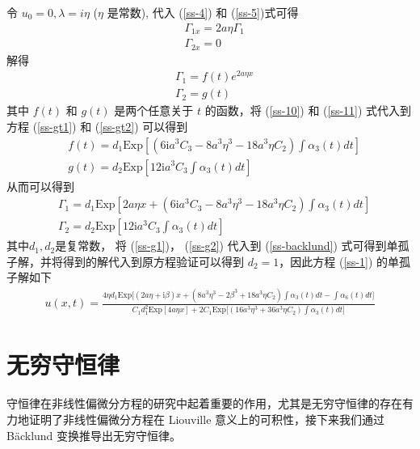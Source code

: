 令 $u_{0} = 0, \lambda = i\eta$ ($\eta$ 是常数), 代入 (\ref{ss-4}) 和  (\ref{ss-5})式可得
\begin{align}
  & \Gamma_{1x} = 2a\eta\Gamma_{1} \\
  & \Gamma_{2x} = 0
\end{align}
解得
\begin{align}
  & \Gamma_{1} = f(t)e^{2a\eta x}  \label{ss-10}\\
  & \Gamma_{2} = g(t) \label{ss-11}
\end{align}
其中 $f(t)$ 和 $g(t)$ 是两个任意关于  $t$ 的函数，将 (\ref{ss-10}) 和 (\ref{ss-11}) 式代入到方程 (\ref{ss-gt1}) 和 (\ref{ss-gt2}) 可以得到
\begin{align}
  & f(t) = d_{1}\mathrm{Exp}\left[(6\mathrm{i}a^{3}C_{3} - 8a^{3}\eta^{3} - 18a^{3}\eta C_{2})\int \alpha_{3}(t)dt\right] \\
  & g(t) = d_{2}\mathrm{Exp}\left[12\mathrm{i}a^{3}C_{3}\int \alpha_{3}(t)dt\right]
\end{align}
从而可以得到
\begin{align}
  & \Gamma_{1} = d_{1}\mathrm{Exp}\left[2a\eta x + (6\mathrm{i}a^{3}C_{3} - 8a^{3}\eta^{3} - 18a^{3}\eta C_{2})\int \alpha_{3}(t)dt\right] \label{ss-g1} \\
  & \Gamma_{2} = d_{2}\mathrm{Exp}\left[12\mathrm{i}a^{3}C_{3}\int \alpha_{3}(t)dt\right] \label{ss-g2}
\end{align}
其中$d_{1}, d_{2}$是复常数， 将  (\ref{ss-g1})， (\ref{ss-g2}) 代入到  (\ref{ss-backlund}) 式可得到单孤子解，并将得到的解代入到原方程验证可以得到 $d_{2} = 1$，因此方程 (\ref{ss-1}) 的单孤子解如下
\begin{align}
  u(x,t) = \frac{4\eta d_{1}\mathrm{Exp}\Big[(2a\eta+\mathrm{i}\beta)x + (8a^{3}\eta^{3} - 2\beta^{3} + 18a^{3}\eta C_{2})\int \alpha_{3}(t)dt - \int \alpha_{6}(t)dt\Big]}{C_1 d_{1}^{2}\mathrm{Exp}[4a\eta x] + 2C_1 \mathrm{Exp}\Big[(16a^{3}\eta^{3}+36a^{3}\eta C_{2})\int \alpha_{3}(t)dt\Big]}  \label{ss-single-soliton}
\end{align}

\section{无穷守恒律}
守恒律在非线性偏微分方程的研究中起着重要的作用，尤其是无穷守恒律的存在有力地证明了非线性偏微分方程在 Liouville 意义上的可积性，接下来我们通过 B\"{a}cklund 变换推导出无穷守恒律。

